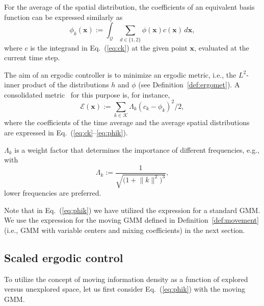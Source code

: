 \documentclass[letterpaper,10pt,conference,twoside]{IEEEtran}
\theoremstyle{definition}
\begin{document}
For the average of the spatial distribution, the coefficients of an equivalent basis function can be expressed similarly as 
\begin{equation}\label{eq:phik}
  \phi_k(\mathbf{x}):=\int_{\mathcal{Q}}{\sum_{d\in\{1,2\}}}{\phi(\mathbf{x})c(\mathbf{x})\,d\mathbf{x}},
\end{equation}
where $c$ is the integrand in Eq.~(\ref{eq:ck}) at the given point $\mathbf{x}$, evaluated at the current time step.

The aim of an ergodic controller is to minimize an ergodic metric, i.e., the $L^2$-inner product of the distributions $h$ and $\phi$ (see Definition~\ref{def:ergomet}). A consolidated metric~\cite{abraham2017ergodic,abraham2021ergodic,seewald2024energy,lerch2023safety,abraham2018decentralized,dong2023time} for this purpose is, for instance, \begin{equation}
  \mathcal{E}(\mathbf{x}):=\sum_{k\in\mathcal{K}}{\Lambda_k(c_k-\phi_k)^2/2},
\end{equation}
where the coefficients of the time average and the average spatial distributions are expressed in Eq.~(\ref{eq:ck}--\ref{eq:phik}).

$\Lambda_k$ is a weight factor that determines the importance of different frequencies, e.g., with
\begin{equation}
  \Lambda_k:=\frac{1}{\sqrt{\big(1+\lVert{k}\rVert^2\big)^3}},
\end{equation}
lower frequencies are preferred.

Note that in Eq.~(\ref{eq:phik}) we have utilized the expression for a standard GMM. 
We use the expression for the moving GMM defined in Definition~\ref{def:movement} (i.e., GMM with variable centers and mixing coefficients) in the next section.


\subsection{Scaled ergodic control}
\label{sec:sol}
\noindent
To utilize the concept of moving information density as a function of explored versus unexplored space, let us first consider Eq.~(\ref{eq:phik}) with the moving GMM.
\end{document}
